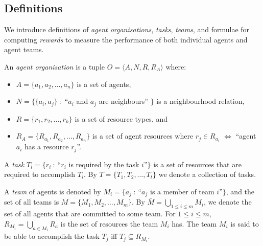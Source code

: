 \documentclass{llncs}
\begin{document}
\subsection{Definitions}
We introduce definitions of \emph{agent organisations}, \emph{tasks}, \emph{teams}, and formulae for computing \emph{rewards} to measure the performance of both individual agents and agent teams.
\begin{definition}
An \emph{agent organisation} is a tuple $O=\langle A, N, R, R_A  \rangle$ where:
\noindent
\begin{itemize}
\item $A= \{ a_1,a_2,...,a_n \} $ is a set of agents,
\item $N=\{\{a_i,a_j \}\ :$ ``$a_i$ and $a_j$ are neighbours'' $\}$ is a neighbourhood relation,
\item $R=\{r_1,r_2,\dots,r_k\}$ is a set of resource types, and
\item $R_A=\{R_{a_1}, R_{a_2}, \dots, R_{a_n}\}$ is a set of agent resources where $r_j \in R_{a_i} $ $\iff$ ``agent $a_i$ has a resource $r_j$''.
\end{itemize}
\end{definition}

\begin{definition}[Task]
A \emph{task} $T_i=\{r_i\ :\ $``$r_i$ is required by the task $i$''$\}$ is a set of resources that are required to accomplish $T_i$. By $T=\{T_1, T_2,\dots, T_t\}$ we denote a collection of tasks.
\end{definition}

\begin{definition}[Team]
A \emph{team} of agents is denoted by $M_i=\{a_j\ :\ $``$a_j$ is a member of team $i$''$\}$, and the set of all teams is $M=\{M_1, M_2,\dots , M_m\}$. By $\bar{M} = \bigcup_{1\leq i\leq m} M_i$, we denote the set of all agents that are committed to some team. For $1\leq i\leq m$, $R_{M_i}=\bigcup_{a \in M_i}R_{a}$ is the set of resources the team $M_i$ has. The team $M_i$ is said to be able to accomplish the task $T_j$ iff $T_j \subseteq R_{M_i}$.
\end{definition}
\end{document}
